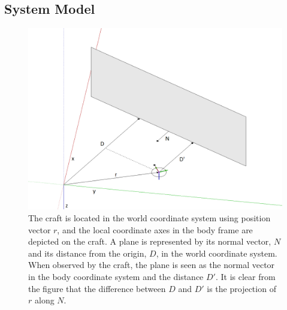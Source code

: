 \documentclass[]{article}
\begin{document}
{%
\clearpage

\subsection{System Model} %
\label{sub:system_model}

\begin{figure}[tb]
	\begin{center}
		\includegraphics[width=\textwidth]{coordinatesystem.png}
	\end{center}
	\caption{The craft is located in the world coordinate system using position vector $r$, and the local coordinate axes in the body frame are depicted on the craft. A plane is represented by its normal vector, $N$ and its distance from the origin, $D$, in the world coordinate system. When observed by the craft, the plane is seen as the normal vector in the body coordinate system and the distance $D'$. It is clear from the figure that the difference between $D$ and $D'$ is the projection of $r$ along $N$.}
	\label{fig:coordinatesystem}
\end{figure}

}
\end{document}
